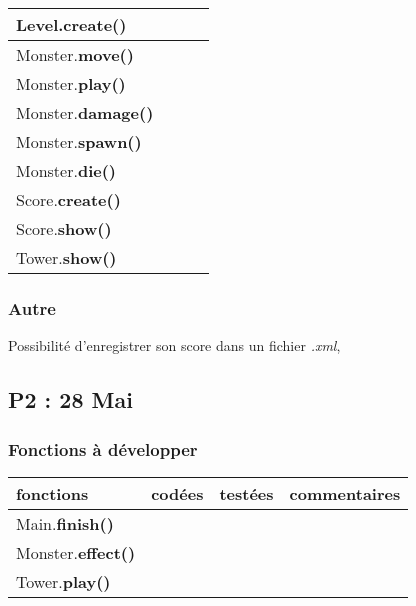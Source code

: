 \documentclass[a4paper]{article}
\begin{document}
\begin{tabular}{|l|c|c|c|}
                \hline
                \hline
                Level.\textbf{create()} & & & \\
                \hline
                \hline
                Monster.\textbf{move()} & & & \\
                \hline
                Monster.\textbf{play()} & & & \\
                \hline
                Monster.\textbf{damage()} & & & \\
                \hline 
                Monster.\textbf{spawn()} & & & \\
                \hline
                Monster.\textbf{die()} & & & \\
                \hline
                \hline
                Score.\textbf{create()} & & & \\
                \hline
                Score.\textbf{show()} & & & \\
                \hline
                \hline
                Tower.\textbf{show()} & & & \\
                \hline
      
            \end{tabular}  
      
            \subsubsection{Autre}
            Possibilité d'enregistrer son score dans un fichier \emph{.xml}, 
        \subsection{P2 : 28 Mai}
            \subsubsection{Fonctions à développer}
            \begin{tabular}{|l|c|c|c|}
                \hline
                fonctions & codées & testées & commentaires \\
                \hline
                Main.\textbf{finish()} & & & \\
                \hline
                \hline
                Monster.\textbf{effect()} & & & \\
                \hline
                \hline
                Tower.\textbf{play()} & & & \\
                \hline 
            \end{tabular}
\end{document}
